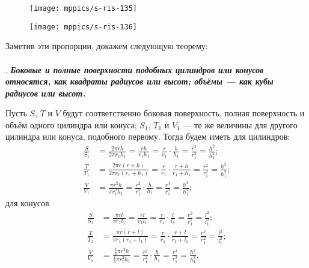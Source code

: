 \begin{figure}[h!]
\begin{minipage}{.48\textwidth}
\centering
\texttt{[image: mppics/s-ris-135]}
\end{minipage}\hfill
\begin{minipage}{.48\textwidth}
\centering
\texttt{[image: mppics/s-ris-136]}
\end{minipage}

\medskip

\begin{minipage}{.48\textwidth}
\centering
\caption{}\label{1938/s-ris-135}
\end{minipage}\hfill
\begin{minipage}{.48\textwidth}
\centering
\caption{}\label{1938/s-ris-136}
\end{minipage}
\vskip-4mm
\end{figure}

Заметив эти пропорции, докажем следующую теорему:

\paragraph{}\label{1938/s124}
.
\textbf{\emph{Боковые и полные поверхности подобных цилиндров или конусов относятся, как квадраты радиусов или высот;
объёмы — как кубы радиусов или высот.}}

Пусть $S$, $T$ и $V$ будут соответственно боковая поверхность, полная поверхность и объём одного цилиндра или конуса;
$S_1$, $T_1$ и $V_1$ — те же величины для другого цилиндра или конуса, подобного первому.
Тогда будем иметь для цилиндров:
\begin{align*}
\frac S{S_1}&=
\frac{2\pi rh}{2\pi r_1h_1}=
\frac{rh}{r_1h_1}=
\frac{r}{r_1}\cdot \frac{h}{h_1}=
\frac{r^2}{r_1^2}=
\frac{h^2}{h_1^2};
\\
\frac T{T_1}&=
\frac{2\pi r(r+h)}{2\pi r_1(r_1+h_1)}=
\frac{r}{r_1}\cdot\frac{r+h}{r_1+h_1}=
\frac{r^2}{r_1^2}=
\frac{h^2}{h_1^2};
\\
\frac V{V_1}&=
\frac{\pi r^2h}{\pi r_1^2h_1}=
\frac{r^2}{r_1^2}\cdot \frac{h}{h_1}=
\frac{r^3}{r_1^3}=
\frac{h^3}{h_1^3};
\end{align*}
для конусов
\begin{align*}
\frac S{S_1}&=
\frac{\pi rl}{\pi r_1l_1}=
\frac{rl}{r_1l_1}=
\frac{r}{r_1}\cdot \frac{l}{l_1}=
\frac{r^2}{r_1^2}=
\frac{l^2}{l_1^2};
\\
\frac T{T_1}&=
\frac{\pi r(r+l)}{\pi r_1(r_1+l_1)}=
\frac{r}{r_1}\cdot\frac{r+l}{r_1+l_1}=
\frac{r^2}{r_1^2}=
\frac{l^2}{l_1^2};
\\
\frac V{V_1}&=
\frac{\frac13\pi r^2h}{\frac13\pi r_1^2h_1}=
\frac{r^2}{r_1^2}\cdot \frac{h}{h_1}=
\frac{r^3}{r_1^3}=
\frac{h^3}{h_1^3}.
\end{align*}


